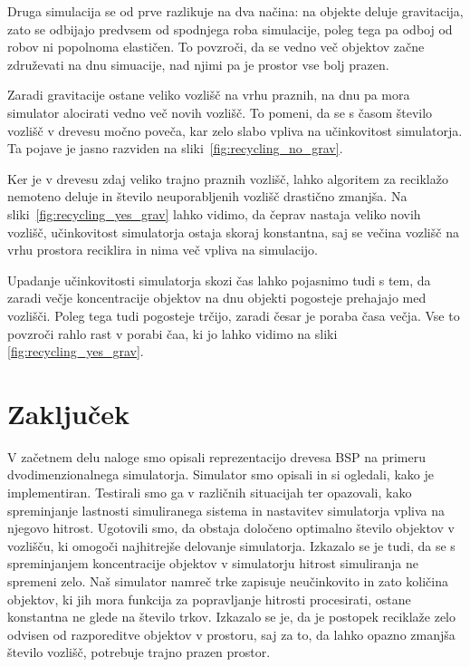 \documentclass[a4paper,12pt]{article}
\begin{document}
Druga simulacija se od prve razlikuje na dva načina: na objekte deluje gravitacija, zato se odbijajo predvsem od spodnjega
roba simulacije, poleg tega pa odboj od robov ni popolnoma elastičen. To povzroči, da se vedno več objektov začne združevati
na dnu simuacije, nad njimi pa je prostor vse bolj prazen.

Zaradi gravitacije ostane veliko vozlišč na vrhu praznih, na dnu pa mora simulator alocirati vedno več novih vozlišč.
To pomeni, da se s časom število vozlišč v drevesu močno poveča, kar zelo slabo vpliva na učinkovitost simulatorja.
Ta pojave je jasno razviden na sliki~\ref{fig:recycling_no_grav}.

Ker je v drevesu zdaj veliko trajno praznih vozlišč, lahko algoritem za reciklažo nemoteno deluje in število neuporabljenih
vozlišč drastično zmanjša. Na sliki~\ref{fig:recycling_yes_grav} lahko vidimo, da čeprav nastaja veliko novih vozlišč, 
učinkovitost simulatorja ostaja skoraj konstantna, saj se večina vozlišč na vrhu prostora reciklira in nima več vpliva
na simulacijo.

Upadanje učinkovitosti simulatorja skozi čas lahko pojasnimo tudi s tem, da zaradi večje koncentracije objektov na dnu
objekti pogosteje prehajajo med vozlišči. Poleg tega tudi pogosteje trčijo, zaradi česar je poraba časa večja.
Vse to povzroči rahlo rast v porabi čaa, ki jo lahko vidimo na sliki \ref{fig:recycling_yes_grav}.
\clearpage
\section{Zaključek}
V začetnem delu naloge smo opisali reprezentacijo drevesa BSP na primeru dvodimenzionalnega simulatorja.
Simulator smo opisali in si ogledali, kako je implementiran. Testirali smo ga v različnih situacijah
ter opazovali, kako spreminjanje lastnosti simuliranega sistema in nastavitev simulatorja vpliva na
njegovo hitrost. Ugotovili smo, da obstaja določeno optimalno število objektov v vozlišču, ki omogoči
najhitrejše delovanje simulatorja. Izkazalo se je tudi, da se s spreminjanjem koncentracije objektov v
simulatorju hitrost simuliranja ne spremeni zelo. Naš simulator namreč trke zapisuje neučinkovito
in zato količina objektov, ki jih mora funkcija za popravljanje hitrosti procesirati, ostane konstantna
ne glede na število trkov. Izkazalo se je, da je postopek reciklaže  zelo odvisen od razporeditve objektov
v prostoru, saj za to, da lahko opazno zmanjša število vozlišč, potrebuje trajno prazen prostor.

\clearpage
\lstlistoflistings{}
\listoffigures{}
\newpage


\end{document}

